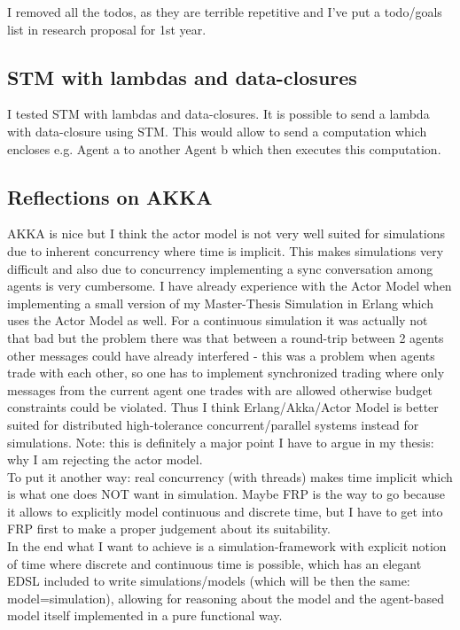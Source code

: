 I removed all the todos, as they are terrible repetitive and I've put a todo/goals list in research proposal for 1st year.

\subsection*{STM with lambdas and data-closures}
I tested STM with lambdas and data-closures. It is possible to send a lambda with data-closure using STM. This would allow to send a computation which encloses e.g. Agent a to another Agent b which then executes this computation.

\subsection*{Reflections on AKKA}
AKKA is nice but I think the actor model is not very well suited for simulations  due to inherent concurrency where time is implicit. This makes simulations very difficult and also due to concurrency implementing a sync conversation among agents is very cumbersome. I have already experience with the Actor Model when implementing a small version of my Master-Thesis Simulation in Erlang which uses the Actor Model as well. For a continuous simulation it was actually not that bad but the problem there was that between a round-trip between 2 agents other messages could have already interfered - this was a problem when agents trade with each other, so one has to implement synchronized trading where only messages from the current agent one trades with are allowed otherwise budget constraints could be violated. Thus I think Erlang/Akka/Actor Model is better suited for distributed high-tolerance concurrent/parallel systems instead for simulations. Note: this is definitely a major point I have to argue in my thesis: why I am rejecting the actor model.
\\
To put it another way: real concurrency (with threads) makes time implicit which is what one does NOT want in simulation. Maybe FRP is the way to go because it allows to explicitly model continuous and discrete time, but I have to get into FRP first to make a proper judgement about its suitability.
\\
In the end what I want to achieve is a simulation-framework with explicit notion of time where discrete and continuous time is possible, which has an elegant EDSL included to write simulations/models (which will be then the same: model=simulation), allowing for reasoning about the model and the agent-based model itself implemented in a pure functional way.



